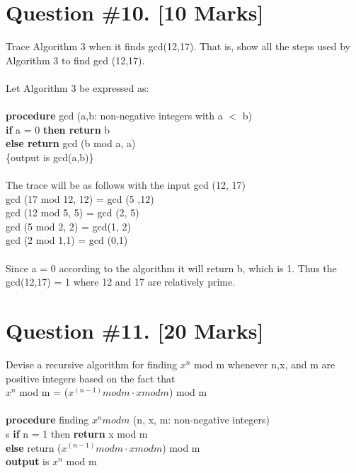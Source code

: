 \documentclass{article}
\begin{document}
\section{Question \#10. [10 Marks]} 
Trace Algorithm 3 when it finds gcd(12,17). That is, show all the steps used by Algorithm 3 to find gcd (12,17).\\\\
Let Algorithm 3 be expressed as: \\\\
\textbf {procedure} gcd (a,b: non-negative integers with a $<$ b) \\
\textbf{if} a = 0 \textbf {then return} b \\
\textbf {else return} gcd (b mod a, a) \\
\{output is gcd(a,b)\} \\ \\
The trace will be as follows with the input gcd (12, 17) \\ 
gcd (17 mod 12, 12) = gcd (5 ,12)\\
gcd (12 mod 5, 5) = gcd (2, 5) \\
gcd (5 mod 2, 2) = gcd(1, 2) \\
gcd (2 mod 1,1) = gcd (0,1) \\\\
Since a = 0 according to the algorithm it will return b, which is 1. Thus the gcd(12,17) = 1 where 12 and 17 are relatively prime.

\newpage

\section{Question \#11. [20 Marks]}
Devise a recursive algorithm for finding $x^n$ mod m whenever n,x, and m are positive integers based on the fact that \\ $x^n$ mod m = ($x^{(n-1)} mod m \cdot x mod m$) mod m \\ \\
\textbf {procedure} finding $x^n mod m$ (n, x, m: non-negative integers) \\s
\textbf{if} n = 1 then \textbf{return}  x mod m \\ 
\textbf{else} return ($x^{(n-1)} mod m \cdot x mod m$) mod m \\
\textbf{output} is $x^n$ mod m 

\newpage
\end{document}
